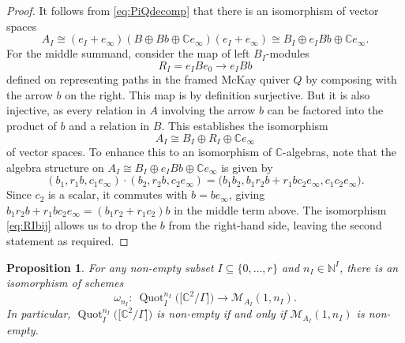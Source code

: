 \documentclass[pdftex]{sigma}%
\newtheorem{Proposition}[Theorem]{Proposition}
 { \theoremstyle{definition}
\newtheorem{Definition}[Theorem]{Definition}
\newtheorem{Example}[Theorem]{Example}
\newtheorem{Remark}[Theorem]{Remark}
\newtheorem{remarks}[theorem]{Remarks}
}
\newcommand{\SC}{\mathbb{C}} %
\newcommand{\PiGamma}{B}
\newcommand{\PiQ}{A}
\DeclareMathOperator{\Quot}{\mathrm{Quot}}
\newcommand{\QuotI}[1][ ]{\Quot_I^{#1}}
\newcommand{\QuotInI}{\QuotI[n_I]}
\numberwithin{equation}{section}
\begin{document}
\begin{proof}
It follows from \eqref{eq:PiQdecomp} that there is an isomorphism of vector spaces
\begin{equation*} \PiQ_I
\cong (e_I+e_\infty) (\PiGamma \oplus \PiGamma b \oplus \SC e_\infty) (e_I+e_\infty) \cong \PiGamma_I \oplus e_I \PiGamma b \oplus \SC e_\infty.\end{equation*}
For the middle summand, consider the map of left $\PiGamma_I$-modules \begin{equation}
\label{eq:RIbij}
R_I = e_I\PiGamma e_0 \longrightarrow e_I\PiGamma b\end{equation} defined on representing paths in the framed McKay quiver $Q$ by composing with the arrow $b$ on the right. This map is by definition surjective. But it is also injective, as every relation in $\PiQ$ involving the arrow $b$ can be factored into the product of $b$ and a relation in $\PiGamma$. This establishes the isomorphism
\begin{equation*}
\PiQ_I \cong \PiGamma_I \oplus R_I \oplus \SC e_\infty
\end{equation*}
of vector spaces. To enhance this to an isomorphism of $\mathbb{C}$-algebras,
note that the algebra structure on $\PiQ_I \cong \PiGamma_I \oplus e_I \PiGamma b \oplus \SC e_\infty$ is given by
\[ (b_1,r_1b,c_1e_\infty) \cdot (b_2,r_2b,c_2e_\infty) = \big(b_1b_2,b_1r_2b+r_1bc_2e_\infty,c_1c_2e_\infty\big).\]
Since $c_2$ is a scalar, it commutes with $b=be_\infty$, giving $b_1r_2b+r_1bc_2e_\infty = (b_1r_2+r_1c_2)b$ in the middle term above. The isomorphism \eqref{eq:RIbij} allows us to drop the $b$ from the right-hand side, leaving the second statement as required.
\end{proof}

\begin{Proposition}
\label{prop:omegaiso}
For any non-empty subset $I\subseteq\{0,\dots,r\}$ and $n_I \in \mathbb{N}^{I}$, there is an isomorphism of schemes
\[\omega_{n_I} \colon \ \QuotInI\big(\big[\SC^2/\Gamma\big]\big) \longrightarrow \mathcal{M}_{\PiQ_I}(1,n_I).\]
In particular, $\QuotInI\big(\big[\SC^2/\Gamma\big]\big)$ is non-empty if and only if $\mathcal{M}_{\PiQ_I}(1,n_I)$ is non-empty.
\end{Proposition}
\end{document}
